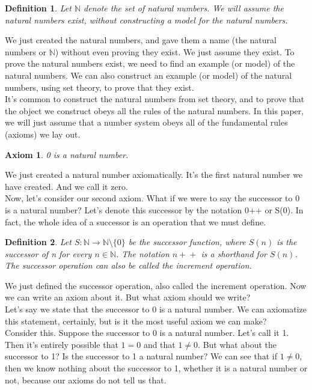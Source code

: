 \documentclass{article}
\newtheorem{axiom}{Axiom}
\newtheorem{definition}{Definition}
\newcommand{\inc}[1]{\mathrel{{{#1}+}+}}
\begin{document}
\begin{definition}
Let $\mathbb{N}$ denote the set of natural numbers. We will assume the natural numbers exist, without constructing a model for the natural numbers.
\end{definition}

We just created the natural numbers, and gave them a name (the natural numbers or $\mathbb{N}$) without even proving they exist. We just assume they exist. To prove the natural numbers exist, we need to find an example (or model) of the natural numbers. We can also construct an example (or model) of the natural numbers, using set theory, to prove that they exist. \\

It's common to construct the natural numbers from set theory, and to prove that the object we construct obeys all the rules of the natural numbers. In this paper, we will just assume that a number system obeys all of the fundamental rules (axioms) we lay out.

\begin{axiom}
0 is a natural number.
\end{axiom}

We just created a natural number axiomatically. It's the first natural number we have created. And we call it zero. \\

Now, let's consider our second axiom. What if we were to say the successor to 0 is a natural number? Let's denote this successor by the notation 0++ or S(0). In fact, the whole idea of a successor is an operation that we must define.

\begin{definition}
Let $S : \mathbb{N} \to \mathbb{N}\setminus\{0\}$ be the successor function, where $S(n)$ is the successor of n for every $n \in \mathbb{N}$. The notation $\inc{n}$ is a shorthand for $S(n)$. The successor operation can also be called the increment operation.
\end{definition}

We just defined the successor operation, also called the increment operation. Now we can write an axiom about it. But what axiom should we write? \\

Let's say we state that the successor to 0 is a natural number. We can axiomatize this statement, certainly, but is it the most useful axiom we can make? \\

Consider this. Suppose the successor to 0 is a natural number. Let's call it 1. Then it's entirely possible that $1 = 0$ and that $1 \neq 0$. But what about the successor to 1? Is the successor to 1 a natural number? We can see that if $1 \neq 0$, then we know nothing about the successor to 1, whether it is a natural number or not, because our axioms do not tell us that. \\
\end{document}
